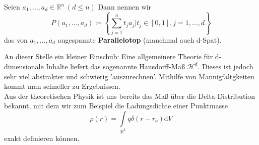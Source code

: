 \begin{definition}[Parallelotop]
    Seien $a_1, \ldots, a_d \in \mathbb{R}^n \ (d \leq n)$ Dann nennen wir
    \begin{equation*}
    	P \left( a_1, \ldots, a_d \right) \coloneqq 
    	\left\lbrace 
    	\sum\limits_{j=1}^n t_j a_j | t_j \in [0,1], j = 1, \ldots, d    
    	\right\rbrace
    \end{equation*}
    das von $a_1, \ldots, a_d $ augespannte \textbf{Parallelotop} (manchmal auch d-Spat).
\end{definition}

An dieser Stelle ein kleiner Einschub: Eine allgemeinere Theorie für d-dimensionale Inhalte liefert das sogenannte
Hausdorff-Maß $\mathcal{H}^d$. Dieses ist jedoch sehr viel abstrakter und schwierig 
'auszurechnen'. Mithilfe von Mannigfaltgkeiten kommt man schneller zu Ergebnissen. \\
Aus der theoretischen Physik ist uns bereits das Maß über die Delta-Distribution bekannt, mit dem wir zum Beispiel die Ladungsdichte einer Punktmasse 
\begin{equation*}
\rho(r)=\int\limits_{\mathbb{R}^3}q\delta(r-r_o)\mathrm{d}V
\end{equation*}
exakt definieren können. 
\newpage
